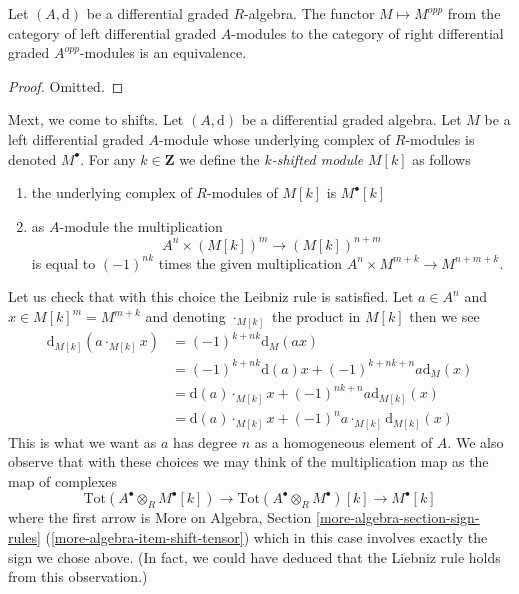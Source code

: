 \begin{lemma}
\label{lemma-left-right}
Let $(A, \text{d})$ be a differential graded $R$-algebra.
The functor $M \mapsto M^{opp}$ from the category of
left differential graded $A$-modules to the category of right
differential graded $A^{opp}$-modules is an equivalence.
\end{lemma}

\begin{proof}
Omitted.
\end{proof}

\noindent
Mext, we come to shifts. Let $(A, \text{d})$ be a differential graded algebra.
Let $M$ be a left differential graded $A$-module whose underlying complex
of $R$-modules is denoted $M^\bullet$.
For any $k \in \mathbf{Z}$ we define the {\it $k$-shifted module}
$M[k]$ as follows
\begin{enumerate}
\item the underlying complex of $R$-modules of $M[k]$ is $M^\bullet[k]$
\item as $A$-module the multiplication
$$
A^n \times (M[k])^m \longrightarrow (M[k])^{n + m}
$$
is equal to $(-1)^{nk}$ times the given multiplication
$A^n \times M^{m + k} \to M^{n + m + k}$.
\end{enumerate}
Let us check that with this choice the Leibniz rule is satisfied.
Let $a \in A^n$ and $x \in M[k]^m = M^{m + k}$ and denoting
$\cdot_{M[k]}$ the product in $M[k]$ then we see
\begin{align*}
\text{d}_{M[k]}(a \cdot_{M[k]} x)
& =
(-1)^{k + nk} \text{d}_M(ax) \\
& =
(-1)^{k + nk} \text{d}(a) x + (-1)^{k + nk + n} a \text{d}_M(x) \\
& =
\text{d}(a) \cdot_{M[k]} x + (-1)^{nk + n} a \text{d}_{M[k]}(x) \\
& =
\text{d}(a) \cdot_{M[k]} x + (-1)^n a \cdot_{M[k]} \text{d}_{M[k]}(x)
\end{align*}
This is what we want as $a$ has degree $n$ as a homogeneous element of $A$.
We also observe that with these choices we may think of
the multiplication map as the map of complexes
$$
\text{Tot}(A^\bullet \otimes_R M^\bullet[k]) \to
\text{Tot}(A^\bullet \otimes_R M^\bullet)[k] \to
M^\bullet[k]
$$
where the first arrow is
More on Algebra, Section \ref{more-algebra-section-sign-rules}
(\ref{more-algebra-item-shift-tensor}) which in this
case involves exactly the sign we chose above. (In fact, we could have deduced
that the Liebniz rule holds from this observation.)

